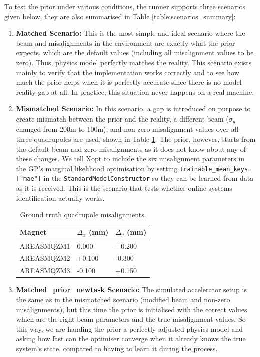 To test the prior under various conditions, the runner supports three scenarios given below, 
they are also summarised in Table \ref{table:scenarios_summary}:

\begin{enumerate}
    \item \textbf{Matched Scenario:} This is the most simple and ideal scenario where the beam and misalignments in the environment are exactly what the prior expects, which are the default values (including all misalignment values to be zero). Thus, physics model perfectly matches the reality. This scenario exists mainly to verify that the implementation works correctly and to see how much the prior helps when it is perfectly accurate since there is no model reality gap at all. In practice, this situation never happens on a real machine. 
    \item \textbf{Mismatched Scenario:} In this scenario, a gap is introduced on purpose to create mismatch between the prior and the reality, a different beam ($\sigma_y$ changed from \SI{200}{\mu}m to \SI{100}{\mu}m), and non zero misalignment values over all three quadrupoles are used, shown in Table \ref{table:misalignment_groundtruth}. The prior, however, starts from the default beam and zero misalignments as it does not know about any of these changes. We tell Xopt to include the six misalignment parameters in the GP’s marginal likelihood optimisation by setting \texttt{trainable\_mean\_keys=["mae"]} in the \texttt{StandardModelConstructor} so they can be learned from data as it is received. This is the scenario that tests whether online systems identification actually works. 
     \begin{table} [htbp]
    \centering
    \small
    \begin{tabular}{p{4.0cm} p{2.0cm} p{2.0cm}}
        \toprule
        \textbf{Magnet} & \textbf{$\Delta_x$ (mm)} & \textbf{$\Delta_y$ (mm)} \\
        \midrule
        AREASMQZM1 & 0.000 & +0.200 \\
        AREASMQZM2 & +0.100 & -0.300 \\ 
        AREASMQZM3 & -0.100 & +0.150 \\ 
        \bottomrule
    \end{tabular}
    \caption{Ground truth quadrupole misalignments.}
    \label{table:misalignment_groundtruth}
\end{table}


    \item \textbf{Matched\_prior\_newtask Scenario:} The simulated accelerator setup is the same as in the mismatched scenario (modified beam and non-zero misalignments), but this time the prior is initialised with the correct values which are the right beam parameters and the true misalignment values. So this way, we are handing the prior a perfectly adjusted physics model and asking how fast can the optimiser converge when it already knows the true system’s state, compared to having to learn it during the process.
\end{enumerate}

